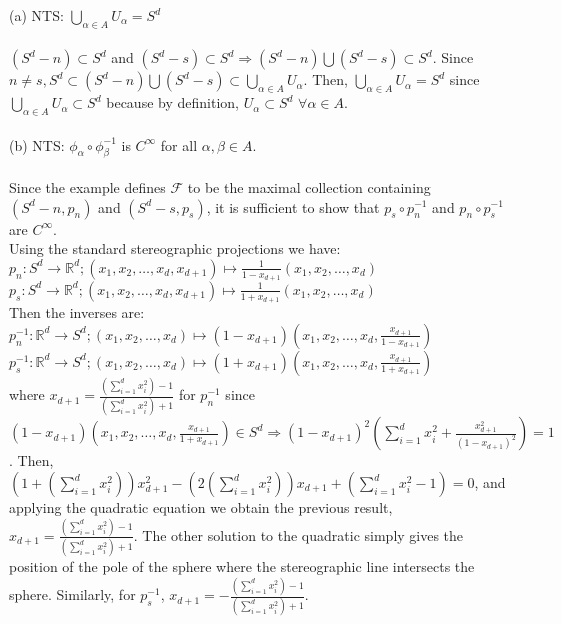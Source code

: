 \documentclass[paper=a4, fontsize=11pt]{scrartcl} %
\numberwithin{equation}{section} %
\numberwithin{figure}{section} %
\numberwithin{table}{section} %
\begin{document}
(a) NTS: $\bigcup\limits_{\alpha \in A} U_{\alpha} = S^d$
\\
\\
$(S^d - n) \subset S^d$ and $(S^d - s) \subset S^d \Rightarrow (S^d - n) \bigcup (S^d - s) \subset S^d$. Since $n \neq s, S^d \subset (S^d - n) \bigcup (S^d - s) \subset \bigcup\limits_{\alpha \in A} U_{\alpha}$. Then, $\bigcup\limits_{\alpha \in A} U_{\alpha} = S^d$ since $\bigcup\limits_{\alpha \in A} U_{\alpha} \subset S^d$ because by definition, $U_\alpha \subset S^d$ $\forall \alpha \in A$.
\\
\\
(b) NTS: $\phi_\alpha \circ \phi_\beta ^{-1}$ is $C^\infty$ for all $\alpha, \beta \in A$.
\\
\\
Since the example defines $\mathscr{F}$ to be the maximal collection containing $(S^d - n, p_n)$ and $(S^d - s, p_s)$, it is sufficient to show that $p_s \circ p_n^{-1}$ and $p_n \circ p_s^{-1}$ are $C^\infty$.
\\
Using the standard stereographic projections we have:
\\
$p_n: S^d \to \mathbb{R}^d; (x_1, x_2, \dots, x_d, x_{d+1}) \mapsto \frac{1}{1-x_{d+1}}(x_1, x_2, \dots, x_d)$ \\
$p_s: S^d \to \mathbb{R}^d; (x_1, x_2, \dots, x_d, x_{d+1}) \mapsto \frac{1}{1+x_{d+1}}(x_1, x_2, \dots, x_d)$ \\
Then the inverses are: \\
$p_n^{-1}: \mathbb{R}^d \to  S^d; (x_1, x_2, \dots, x_d) \mapsto (1-x_{d+1})(x_1, x_2, \dots, x_d, \frac{x_{d+1}}{1-x_{d+1}})$ \\
$p_s^{-1}:  \mathbb{R}^d  \to S^d; (x_1, x_2, \dots, x_d) \mapsto (1+x_{d+1})(x_1, x_2, \dots, x_d,  \frac{x_{d+1}}{1+x_{d+1}})$ \\
where $x_{d+1} = \frac{(\sum_{i=1}^{d} x_i ^2) - 1}{(\sum_{i=1}^{d} x_i ^2) + 1}$ for $p_n^{-1}$ since $(1-x_{d+1})(x_1, x_2, \dots, x_d,  \frac{x_{d+1}}{1+x_{d+1}}) \in S^d \Rightarrow (1-x_{d+1})^2(\sum_{i=1}^{d} x_i ^2 +  \frac{x_{d+1} ^2}{(1-x_{d+1})^2}) = 1$. Then, $(1+(\sum_{i=1}^{d} x_i ^2))x_{d+1} ^2 - (2(\sum_{i=1}^{d} x_i ^2))x_{d+1} +  (\sum_{i=1}^{d} x_i ^2 - 1) =0$, and applying the quadratic equation we obtain the previous result, $x_{d+1} = \frac{(\sum_{i=1}^{d} x_i ^2) - 1}{(\sum_{i=1}^{d} x_i ^2) + 1}$. The other solution to the quadratic simply gives the position of the pole of the sphere where the stereographic line intersects the sphere. Similarly, for $p_s^{-1}$, $x_{d+1} = -\frac{(\sum_{i=1}^{d} x_i ^2) - 1}{(\sum_{i=1}^{d} x_i ^2) + 1}$.
\\
\end{document}
